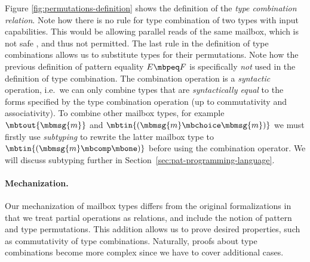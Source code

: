 Figure \ref{fig:permutations-definition} shows the definition of the \emph{type combination relation}.
Note how there is no rule for type combination of two types with input capabilities.
This would be allowing parallel reads of the same mailbox, which is not safe \cite{deliguoroMailboxTypesUnordered2018}, and thus not permitted.
The last rule in the definition of type combinations allows us to substitute types for their permutations.
Note how the previous definition of pattern equality $E \mbpeq F$ is specifically \emph{not} used in the definition of type combination.
%
The combination operation is a \emph{syntactic} operation, i.e.\ we can only
combine types that are \emph{syntactically equal} to the forms specified by the
type combination operation (up to commutativity and associativity).
To combine other mailbox types, for example
$\mbtout{\mbmsg{m}}$ and $\mbtin{(\mbmsg{m} \mbchoice \mbmsg{m})}$ we must firstly use
\emph{subtyping} to rewrite the latter mailbox type to $\mbtin{(\mbmsg{m} \mbcomp \mbone)}$
before using the combination operator. We will discuss subtyping further in
Section~\ref{sec:pat-programming-language}.




\paragraph{Mechanization.}
Our mechanization of mailbox types differs from the original formalizations in that we treat partial operations as relations,
and include the notion of pattern and type permutations.
This addition allows us to prove desired properties, such as commutativity of type combinations.
Naturally, proofs about type combinations become more complex since we have to cover additional cases.
